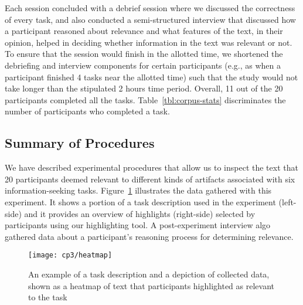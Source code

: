 


Each session concluded with a debrief session where we discussed the
correctness of every task,
and also conducted a semi-structured
interview that discussed how a participant reasoned about relevance
and what features of the text, in their opinion, helped in deciding
whether information in the text was relevant or not.
To ensure that the session would finish in the allotted time,
we shortened the debriefing and interview components 
for certain participants
(e.g., as when a participant finished 4 tasks near the allotted time)
such that the study would not take longer than the stipulated 2 hours time period.
Overall, 11 out of the 20 participants completed all the tasks.
Table~\ref{tbl:corpus-stats} discriminates the number of participants who completed a task.




\subsection{Summary of Procedures}


We have described experimental procedures that allow us to inspect the 
text that 20 participants deemed relevant to different kinds of artifacts 
associated with six information-seeking tasks. 
Figure~\ref{fig:task-highlights-heatmap} illustrates the data gathered with this experiment. 
It shows a portion of a task description used in the experiment (left-side) and it
provides an overview of highlights (right-side) selected by
participants using our highlighting tool. 
A post-experiment interview algo gathered data 
about a participant's
reasoning process for determining relevance.



\begin{figure}
    \centering
    \texttt{[image: cp3/heatmap]}
\caption{An example of a task description and a depiction of collected data, shown as a heatmap of text that participants highlighted as relevant to the task}
\label{fig:task-highlights-heatmap}
\end{figure}







